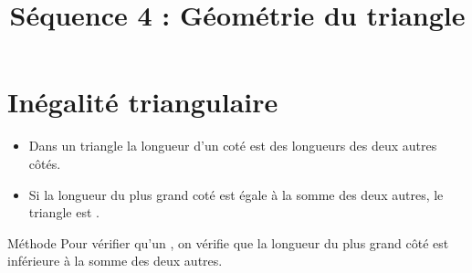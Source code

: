 \documentclass[xcolor={dvipsnames}]{beamer}
\title{Séquence 4 : Géométrie du triangle}
\begin{document}
\begin{frame}
  \titlepage 
\end{frame}


	
\begin{frame}
	
\end{frame}

\section{Inégalité triangulaire}


\begin{frame}
	\begin{myprop}
		
		\begin{itemize}
			\item Dans un triangle la longueur d'un coté est  des longueurs des deux autres côtés.\pause
			
			\item  Si la longueur du plus grand coté est égale à la somme des deux autres, le triangle est .
		\end{itemize}
			
			

		
	\end{myprop}
	
	\begin{block}{Méthode}
		Pour vérifier qu'un , \pause on vérifie que la longueur du plus grand côté  est inférieure à la somme des deux autres.
	\end{block}
\end{frame}
\end{document}

